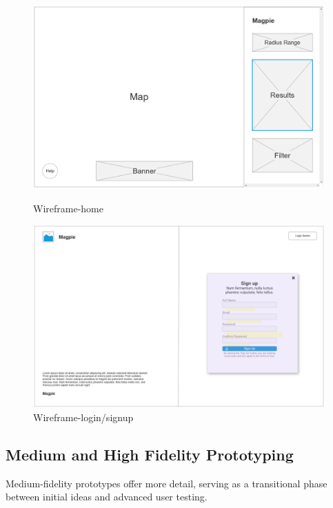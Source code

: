 \begin{figure}[h]
    \centering
    \begin{minipage}{0.48\textwidth}
        \centering
        \includegraphics[width=\textwidth]{images/wireframe-home.jpg}
        \caption{Wireframe-home}
        \label{fig:wireframe-home}
    \end{minipage}
    \hfill
    \begin{minipage}{0.48\textwidth}
        \centering
        \includegraphics[width=\textwidth]{images/wireframe-signup.jpg}
        \caption{Wireframe-login/signup}
        \label{fig:wireframe-signup}
    \end{minipage}
\end{figure}

\subsection{Medium and High Fidelity Prototyping}
Medium-fidelity prototypes offer more detail, serving as a transitional phase between initial ideas and advanced user testing.

